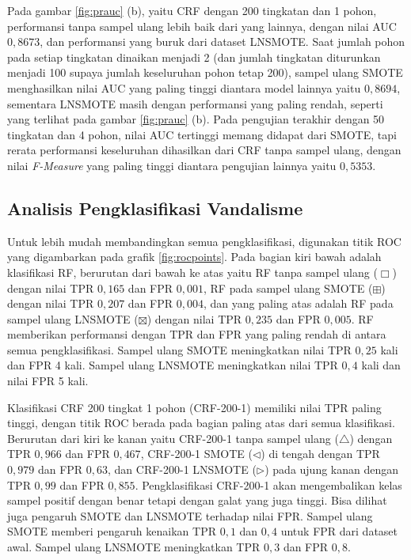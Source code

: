 Pada gambar \ref{fig:prauc} (b), yaitu CRF dengan 200 tingkatan dan 1 pohon,
performansi tanpa sampel ulang lebih baik dari yang lainnya, dengan nilai AUC
$0,8673$, dan performansi yang buruk dari dataset LNSMOTE.
Saat jumlah pohon pada setiap tingkatan dinaikan menjadi 2 (dan jumlah
tingkatan diturunkan menjadi 100 supaya jumlah keseluruhan pohon tetap 200),
sampel ulang SMOTE menghasilkan nilai AUC yang paling tinggi diantara
model lainnya yaitu $0,8694$, sementara LNSMOTE masih dengan performansi yang
paling rendah, seperti yang terlihat pada gambar \ref{fig:prauc} (b).
Pada pengujian terakhir dengan 50 tingkatan dan 4 pohon, nilai AUC tertinggi
memang didapat dari SMOTE, tapi rerata performansi keseluruhan dihasilkan dari
CRF tanpa sampel ulang, dengan nilai \textit{F-Measure} yang paling tinggi
diantara pengujian lainnya yaitu $0,5353$.



\subsection{Analisis Pengklasifikasi Vandalisme}

Untuk lebih mudah membandingkan semua pengklasifikasi, digunakan titik
ROC yang digambarkan pada grafik \ref{fig:rocpoints}.
Pada bagian kiri bawah adalah klasifikasi RF, berurutan dari bawah ke atas
yaitu RF tanpa sampel ulang ($\Box$) dengan nilai TPR $0,165$ dan FPR $0,001$,
RF pada sampel ulang SMOTE ($\boxplus$) dengan nilai TPR $0,207$ dan FPR
$0,004$, dan yang
paling atas adalah RF pada sampel ulang LNSMOTE ($\boxtimes$) dengan nilai TPR
$0,235$ dan FPR $0,005$.
RF memberikan performansi dengan TPR dan FPR yang paling rendah di antara semua
pengklasifikasi.
Sampel ulang SMOTE meningkatkan nilai TPR $0,25$ kali dan FPR 4 kali.
Sampel ulang LNSMOTE meningkatkan nilai TPR $0,4$ kali dan nilai FPR 5 kali.

Klasifikasi CRF 200 tingkat 1 pohon (CRF-200-1) memiliki nilai TPR paling
tinggi, dengan titik ROC berada pada bagian paling atas dari semua klasifikasi.
Berurutan dari kiri ke kanan yaitu CRF-200-1 tanpa sampel ulang ($\triangle$)
dengan TPR $0,966$ dan FPR $0,467$, CRF-200-1 SMOTE ($\triangleleft$) di tengah
dengan TPR $0,979$ dan FPR $0,63$, dan CRF-200-1 LNSMOTE ($\triangleright$)
pada ujung kanan dengan TPR $0,99$ dan FPR $0,855$.
Pengklasifikasi CRF-200-1 akan mengembalikan kelas sampel positif dengan benar
tetapi dengan galat yang juga tinggi.
Bisa dilihat juga pengaruh SMOTE dan LNSMOTE terhadap nilai FPR.
Sampel ulang SMOTE memberi pengaruh kenaikan TPR $0,1$ dan $0,4$ untuk FPR dari
dataset awal.
Sampel ulang LNSMOTE meningkatkan TPR $0,3$ dan FPR $0,8$.

